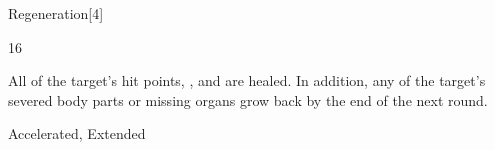 \begin{spellsection}{Regeneration}[4]
\begin{spellcontent}
\begin{spelltargetinginfo}
 16
\end{spelltargetinginfo}
\begin{spelleffects}
\spelleffect
All of the target's hit points, , and  are healed.
In addition, any of the target's severed body parts or missing organs grow back by the end of the next round.
\end{spelleffects}
\end{spellcontent}
\begin{spellfooter}
 Accelerated, Extended
\end{spellfooter}
\begin{spellsubcontent}
\end{spellsubcontent}
\end{spellsection}
